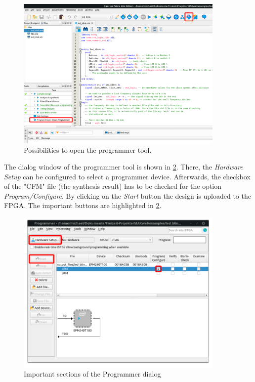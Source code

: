 \begin{figure}[h!]
	\centering
	\includegraphics[width=0.9\textwidth]{fig/quartus_start_programming.png}
	\caption{Possibilities to open the programmer tool.}
	\label{fig:quartus_start_programmer}
\end{figure}

The dialog window of the programmer tool is shown in \cref{fig:quartus_programmer}. There, the \textit{Hardware Setup} can be configured to select a programmer device. Afterwards, the checkbox of the "CFM" file (the synthesis result) has to be checked for the option \textit{Program/Configure}. By clicking on the \textit{Start} button the design is uploaded to the FPGA. The important buttons are highlighted in \cref{fig:quartus_programmer}.

\begin{figure}[h!]
	\centering
	\includegraphics[width=0.9\textwidth]{fig/quartus_programmer.png}
	\caption{Important sections of the Programmer dialog}
	\label{fig:quartus_programmer}
\end{figure}


